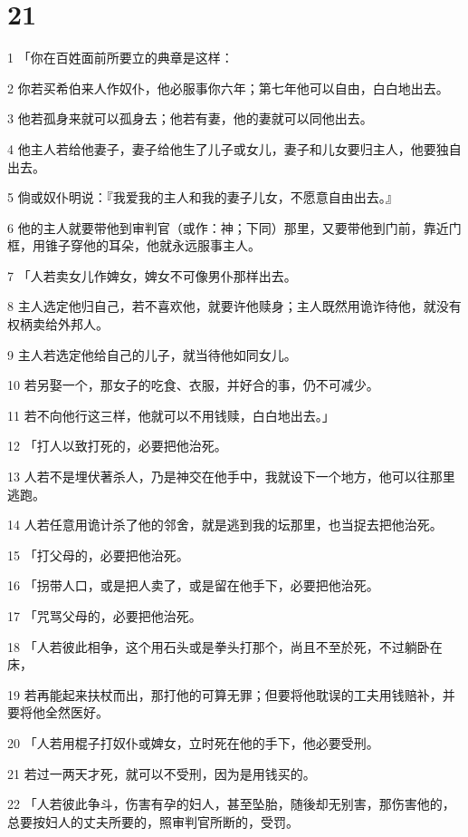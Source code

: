 \chapter{21}

\par 1 「你在百姓面前所要立的典章是这样：
\par 2 你若买希伯来人作奴仆，他必服事你六年；第七年他可以自由，白白地出去。
\par 3 他若孤身来就可以孤身去；他若有妻，他的妻就可以同他出去。
\par 4 他主人若给他妻子，妻子给他生了儿子或女儿，妻子和儿女要归主人，他要独自出去。
\par 5 倘或奴仆明说：『我爱我的主人和我的妻子儿女，不愿意自由出去。』
\par 6 他的主人就要带他到审判官（或作：神；下同）那里，又要带他到门前，靠近门框，用锥子穿他的耳朵，他就永远服事主人。
\par 7 「人若卖女儿作婢女，婢女不可像男仆那样出去。
\par 8 主人选定他归自己，若不喜欢他，就要许他赎身；主人既然用诡诈待他，就没有权柄卖给外邦人。
\par 9 主人若选定他给自己的儿子，就当待他如同女儿。
\par 10 若另娶一个，那女子的吃食、衣服，并好合的事，仍不可减少。
\par 11 若不向他行这三样，他就可以不用钱赎，白白地出去。」
\par 12 「打人以致打死的，必要把他治死。
\par 13 人若不是埋伏著杀人，乃是神交在他手中，我就设下一个地方，他可以往那里逃跑。
\par 14 人若任意用诡计杀了他的邻舍，就是逃到我的坛那里，也当捉去把他治死。
\par 15 「打父母的，必要把他治死。
\par 16 「拐带人口，或是把人卖了，或是留在他手下，必要把他治死。
\par 17 「咒骂父母的，必要把他治死。
\par 18 「人若彼此相争，这个用石头或是拳头打那个，尚且不至於死，不过躺卧在床，
\par 19 若再能起来扶杖而出，那打他的可算无罪；但要将他耽误的工夫用钱赔补，并要将他全然医好。
\par 20 「人若用棍子打奴仆或婢女，立时死在他的手下，他必要受刑。
\par 21 若过一两天才死，就可以不受刑，因为是用钱买的。
\par 22 「人若彼此争斗，伤害有孕的妇人，甚至坠胎，随後却无别害，那伤害他的，总要按妇人的丈夫所要的，照审判官所断的，受罚。
